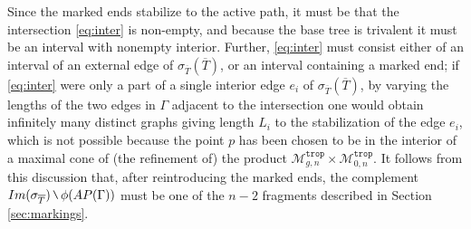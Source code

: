 \documentclass[11pt,reqno]{amsart}
\theoremstyle{definition}
\newcommand\trop{{\mathtt{trop}}}
\newcommand\Mgn[1]{\mathcal M_{#1}}
\newcommand{\mysetminusD}{\hbox{\tikz{\draw[line width=0.6pt,line cap=round] (3pt,0) -- (0,6pt);}}}
\newcommand{\mysetminusT}{\mysetminusD}
\newcommand{\mysetminusS}{\hbox{\tikz{\draw[line width=0.45pt,line cap=round] (2pt,0) -- (0,4pt);}}}
\newcommand{\mysetminusSS}{\hbox{\tikz{\draw[line width=0.4pt,line cap=round] (1.5pt,0) -- (0,3pt);}}}
\newcommand{\mysetminus}{\mathbin{\mathchoice{\mysetminusD}{\mysetminusT}{\mysetminusS}{\mysetminusSS}}}
\renewcommand\smallsetminus\mysetminus
\begin{document}
Since the marked ends stabilize to the active path, it must be that the intersection \eqref{eq:inter} is non-empty, and because the base tree is  trivalent it must be an interval with nonempty interior. Further,  \eqref{eq:inter} must consist either  of an interval of an external edge of $\sigma_{\overline{T}}(\overline{T})$, or an interval containing a marked end; if \eqref{eq:inter} were only a part of a single interior edge $e_i$ of $\sigma_{\overline{T}}(\overline{T})$, by varying the lengths of the two edges in $\Gamma$ adjacent to the intersection one would obtain infinitely many distinct graphs giving length $L_i$ to the stabilization of the edge $e_i$, which is not possible because the point $p$ has been chosen to be in the interior of a maximal cone of (the refinement of) the product $\Mgn{g,n}^\trop\times \Mgn{0,n}^\trop$.
It follows from this discussion that, after reintroducing the marked ends,  the complement 
$Im(\sigma_{\overline{T}})\smallsetminus \phi(AP(\Gamma))$ must be one of the $n-2$ fragments described in Section \ref{sec:markings}.
\end{document}
